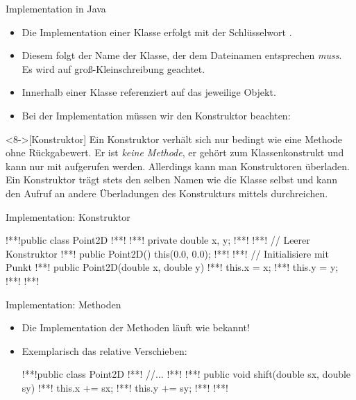 \begin{frame}{Implementation in Java}
    \begin{itemize}[<+(1)->]
        \item Die Implementation einer Klasse erfolgt mit der Schlüsselwort .
        \item Diesem folgt der Name der Klasse,\pause{} der dem Dateinamen entsprechen \emph{muss}.\pause{} Es wird auf groß-Kleinschreibung geachtet.
        \item Innerhalb einer Klasse referenziert  auf das jeweilige Objekt.
        \item Bei der Implementation müssen wir den Konstruktor beachten:
    \end{itemize}
    \begin{definition}<8->[Konstruktor]
        \pause{}Ein Konstruktor verhält sich nur bedingt wie eine Methode ohne Rückgabewert. Er ist \emph{keine Methode},\pause{} er gehört zum Klassenkonstrukt und kann nur mit  aufgerufen werden. Allerdings kann man Konstruktoren überladen.\medskip\newline
        Ein Konstruktor trägt stets den selben Namen wie die Klasse selbst und kann den Aufruf an andere Überladungen des Konstrukturs mittels  durchreichen.
    \end{definition}
\end{frame}


\begin{frame}[fragile]{Implementation: Konstruktor}
\begin{plainjava}
!**!public class Point2D {
!**!
!**!    private double x, y;
!**!
!**!    // Leerer Konstruktor
!**!    public Point2D() { this(0.0, 0.0); }
!**!
!**!    // Initialisiere mit Punkt
!**!    public Point2D(double x, double y) {
!**!        this.x = x;
!**!        this.y = y;
!**!    }
!**!}
\end{plainjava}
\end{frame}

\begin{frame}[fragile]{Implementation: Methoden}
\begin{itemize}[<+(1)->]
    \item Die Implementation der Methoden läuft wie bekannt!
    \item Exemplarisch das relative Verschieben:
\begin{plainjava}
!**!public class Point2D {
!**!    //...
!**!
!**!    public void shift(double sx, double sy) {
!**!        this.x += sx;
!**!        this.y += sy;
!**!    }
!**!}
\end{plainjava}
\end{itemize}
\end{frame}

